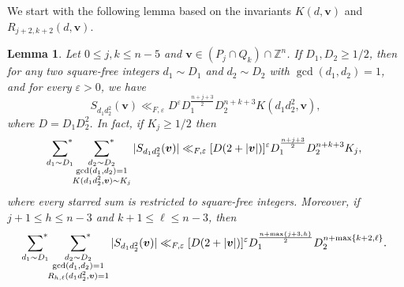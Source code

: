 \documentclass[a4paper,11pt, twoside,reqno]{amsart}
\theoremstyle{plain}
\newtheorem{lemma}[thm]{Lemma}
\theoremstyle{definition}
\theoremstyle{remark}
\newcommand{\bfv}{\bm{v}}
\newcommand{\ZZ}{\mathbb{Z}}
\newcommand{\ve}{\varepsilon}
\renewcommand{\le}{\leqslant}
\renewcommand{\ge}{\geqslant}
\numberwithin{equation}{section}
\begin{document}
We start with the following lemma
based on the invariants $K(d,\bfv)$ and $R_{j+2,k+2}(d,\bfv)$.
\begin{lemma}\label{n10:Lemma-weight-gen}
Let $0\le j,k\le n-5$ and
$\bfv\in(P_j\cap Q_k)\cap\ZZ^n$.
If $D_1,D_2\ge 1/2$,
then for any two square-free integers $d_{1}\sim D_1$ and $d_2\sim D_2$
with $\gcd(d_{1},d_{2})=1$,
and for every $\ve>0$, we have
\begin{equation}
\label{EQ:K-relaxed-hybrid-pointwise}
S_{d_{1}d_{2}^{2}}(\bfv)
\ll_{F,\ve} D^\ve D_1^{\frac{n+j+3}{2}}D_2^{n+k+3} K(d_1d_2^2,\bfv),
\end{equation}
where $D = D_1D_2^2$.
In fact, if $K_j\ge 1/2$ then
\begin{equation}\label{n10:weighted-fixed-point}
\sideset{}{^*}\sum_{d_1\sim D_1}
\sideset{}{^*}\sum_{\substack{
d_2\sim D_2\\\gcd(d_1,d_2)=1
\\ K(d_1d_2^2,\bfv)\sim K_j}}
|S_{d_1d_2^2}(\bfv)|
\ll_{F,\ve}
[D(2+|\bfv|)]^\ve
D_1^{\frac{n+j+3}{2}}D_2^{n+k+3}
K_j,
\end{equation}
where every starred sum is restricted to square-free integers.
Moreover, if $j+1\le h\le n-3$ and $k+1\le\ell\le n-3$, then
\begin{equation}
\label{n10:residual-fixed-point}
\sideset{}{^*}\sum_{d_1\sim D_1}
\sideset{}{^*}\sum_{\substack{
d_2\sim D_2\\\gcd(d_1,d_2)=1
\\ R_{h,\ell}(d_1d_2^2,\bfv) = 1}}
|S_{d_1d_2^2}(\bfv)|
\ll_{F,\ve}
[D(2+|\bfv|)]^\ve
D_1^{\frac{n+\max\{j+3,h\}}{2}}
D_2^{n + \max\{k+2,\ell\}}.
\end{equation}
\end{lemma}
\end{document}
